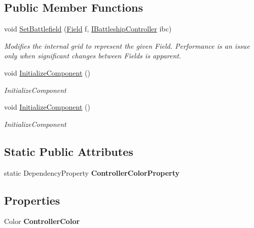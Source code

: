 \subsection*{Public Member Functions}
\begin{DoxyCompactItemize}
\item 
void \hyperlink{class_m_b_c_1_1_w_p_f_1_1_field_control_a2f7f336f27ae6c9517c54fcb142120b1}{Set\-Battlefield} (\hyperlink{class_m_b_c_1_1_core_1_1_field}{Field} f, \hyperlink{interface_m_b_c_1_1_core_1_1_i_battleship_controller}{I\-Battleship\-Controller} ibc)
\begin{DoxyCompactList}\small\item\em Modifies the internal grid to represent the given Field. Performance is an issue only when significant changes between Fields is apparent.\end{DoxyCompactList}\item 
void \hyperlink{class_m_b_c_1_1_w_p_f_1_1_field_control_ad69b8fbbb09f421a3a639c41f1e909d4}{Initialize\-Component} ()
\begin{DoxyCompactList}\small\item\em Initialize\-Component \end{DoxyCompactList}\item 
void \hyperlink{class_m_b_c_1_1_w_p_f_1_1_field_control_ad69b8fbbb09f421a3a639c41f1e909d4}{Initialize\-Component} ()
\begin{DoxyCompactList}\small\item\em Initialize\-Component \end{DoxyCompactList}\end{DoxyCompactItemize}
\subsection*{Static Public Attributes}
\begin{DoxyCompactItemize}
\item 
\hypertarget{class_m_b_c_1_1_w_p_f_1_1_field_control_a857a98b4eb4c41c1e72ffee5b30350b0}{static Dependency\-Property {\bfseries Controller\-Color\-Property}}\label{class_m_b_c_1_1_w_p_f_1_1_field_control_a857a98b4eb4c41c1e72ffee5b30350b0}

\end{DoxyCompactItemize}
\subsection*{Properties}
\begin{DoxyCompactItemize}
\item 
\hypertarget{class_m_b_c_1_1_w_p_f_1_1_field_control_a177e271e203fe5feba6766535886195b}{Color {\bfseries Controller\-Color}}\label{class_m_b_c_1_1_w_p_f_1_1_field_control_a177e271e203fe5feba6766535886195b}

\end{DoxyCompactItemize}


